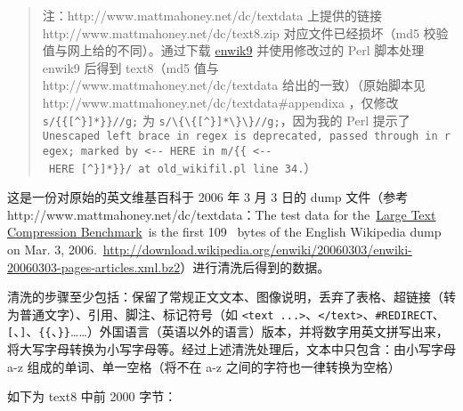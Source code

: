 \documentclass[11pt]{article}
\begin{document}
\begin{quote}
注：http://www.mattmahoney.net/dc/textdata 上提供的链接
http://www.mattmahoney.net/dc/text8.zip 对应文件已经损坏（md5
校验值与网上给的不同）。通过下载
\href{http://www.mattmahoney.net/dc/enwik9.zip}{enwik9} 并使用修改过的
Perl 脚本处理 enwik9 后得到 text8（md5 值与
http://www.mattmahoney.net/dc/textdata 给出的一致）（原始脚本见
http://www.mattmahoney.net/dc/textdata\#appendixa ，仅修改
\texttt{s/\{\{{[}\^{}\}{]}*\}\}//g;} 为
\texttt{s/\textbackslash{}\{\textbackslash{}\{{[}\^{}\}{]}*\textbackslash{}\}\textbackslash{}\}//g;}，因为我的
Perl 提示了
\texttt{Unescaped\ left\ brace\ in\ regex\ is\ deprecated,\ passed\ through\ in\ regex;\ marked\ by\ \textless{}-\/-\ HERE\ in\ m/\{\{\ \textless{}-\/-\ HERE\ {[}\^{}\}{]}*\}\}/\ at\ old\_wikifil.pl\ line\ 34.}）
\end{quote}

这是一份对原始的英文维基百科于 2006 年 3 月 3 日的 dump 文件（参考
http://www.mattmahoney.net/dc/textdata：The test data for
the~\href{http://www.mattmahoney.net/dc/text.html}{Large Text
Compression Benchmark}~is the first 109 ~bytes of the English Wikipedia
dump on Mar. 3,
2006.~\url{http://download.wikipedia.org/enwiki/20060303/enwiki-20060303-pages-articles.xml.bz2}）进行清洗后得到的数据。

清洗的步骤至少包括：保留了常规正文文本、图像说明，丢弃了表格、超链接（转为普通文字）、引用、脚注、标记符号（如
\texttt{\textless{}text\ ...\textgreater{}}、\texttt{\textless{}/text\textgreater{}}、\texttt{\#REDIRECT}、\texttt{{[}}、\texttt{{]}}、\texttt{\{\{}、\texttt{\}\}}\ldots{}\ldots{}）外国语言（英语以外的语言）版本，并将数字用英文拼写出来，将大写字母转换为小写字母等。经过上述清洗处理后，文本中只包含：由小写字母
a-z 组成的单词、单一空格（将不在 a-z 之间的字符也一律转换为空格）

如下为 text8 中前 2000 字节：
\end{document}
